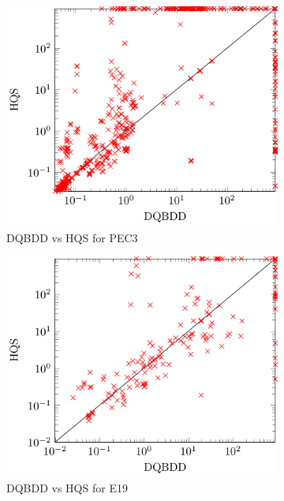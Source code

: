 \documentclass[
  digital, %
  color,
  twoside, %
  table,   %
  nolof,     %
  nolot,     %
]{fithesis3}
\theoremstyle{definition}
\theoremstyle{remark}
\begin{document}
\begin{figure}[p]
  \begin{subfigure}{0.48\textwidth}
    \centering
    \includegraphics[width=\linewidth]{figures/PEC3dqbddVShqs.pdf}
    \caption{DQBDD vs HQS for PEC3}
    \label{fig:PEC3dqbddVShqs}
  \end{subfigure}
  \begin{subfigure}{0.48\textwidth}
    \centering
    \includegraphics[width=\linewidth]{figures/E19dqbddVShqs.pdf}
    \caption{DQBDD vs HQS for E19}
    \label{fig:E19dqbddVShqs}
  \end{subfigure}
  \begin{subfigure}{0.48\textwidth}

\end{subfigure}
\end{figure}
\end{document}
